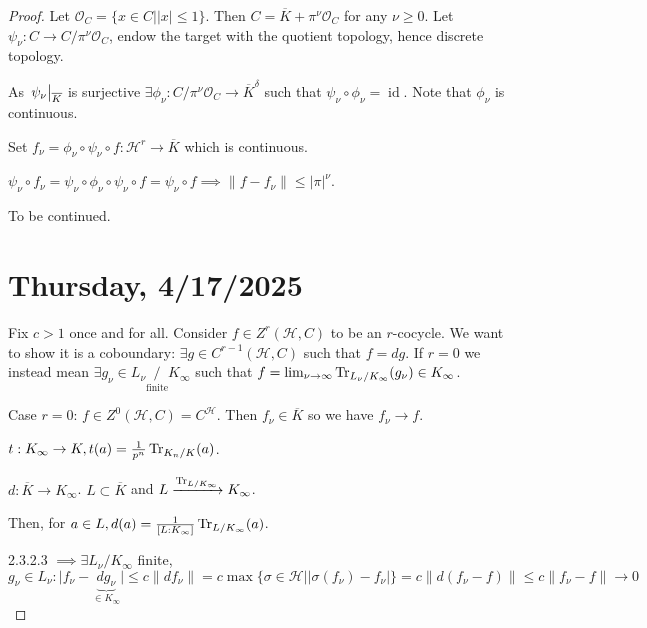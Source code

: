 \documentclass{article}
\theoremstyle{definition}
\numberwithin{theorem}{subsection}
\begin{document}
    \begin{proof}
        Let \(\mathcal{O}_C = \{ x\in C \mid \vert x \vert \leq 1 \}\). Then \(C = \overline{K} + \pi^{\nu} \mathcal{O}_C\) for any \(\nu \geq 0\). Let \(\psi_\nu : C \to C / \pi^{\nu} \mathcal{O}_C\), endow the target with the quotient topology, hence discrete topology.
        
        As \(\eval{\psi_\nu}_{\overline{K}}\) is surjective \(\exists \phi_\nu : C / \pi^{\nu} \mathcal{O}_C \to \overline{K}^\delta \) such that \(\psi_\nu \circ \phi_\nu = \operatorname{id}\). Note that \(\phi_\nu\) is continuous.
        
        Set \(f_\nu = \phi_\nu \circ \psi_\nu \circ f: \mathscr{H}^r \to \overline{K}\) which is continuous.
        
        \(\psi_\nu \circ f_\nu = \psi_\nu \circ \phi_\nu \circ \psi_\nu \circ f = \psi_\nu \circ f \implies \lVert f - f_\nu \rVert \leq \vert \pi \vert^{\nu}\). 

        To be continued.

        \section*{Thursday, 4/17/2025}
        
        Fix \(c > 1\) once and for all. Consider \(f\in Z^r(\mathscr{H}, C)\) to be an \(r\)-cocycle. We want to show it is a coboundary: \(\exists g \in C^{r-1}(\mathscr{H}, C)\) such that \(f = dg\). If \(r=0\) we instead mean \(\exists g_\nu\in L_\nu \underset{\text{finite}}{/} K_\infty\) such that \(f = \lim_{\nu \to \infty} \Tr_{L_\nu / K_\infty}(g_\nu) \in K_\infty\).

        Case \(r=0\): \(f\in Z^0(\mathscr{H}, C) = C^{\mathscr{H}}\). Then \(f_\nu \in \overline{K}\) so we have \(f_\nu \to f\).

        \(t: K_\infty \to K, t(a) = \frac{1}{p^n} \Tr_{K_n / K}(a)\).
        
        \(d: \overline{K} \to K_\infty\). \(L \subset \overline{K}\) and \(L \xrightarrow{\Tr_{L / K_\infty}} K_\infty\).
        
        Then, for \(a\in L, d(a) = \frac{1}{[L:K_\infty]} \Tr_{L / K_\infty}(a)\).
        
        2.3.2.3 \(\implies \exists L_\nu / K_\infty\) finite, \(g_\nu \in L_\nu: \vert f_\nu - \underbrace{dg_\nu}_{\in K_\infty} \vert \leq c \lVert d f_\nu \rVert = c \max \{ \sigma \in \mathscr{H} \mid \vert \sigma(f_\nu) - f_\nu \vert  \} = c \lVert d(f_\nu - f) \rVert \leq c \lVert f_\nu - f \rVert \to 0 \)
        

\end{proof}
\end{document}
